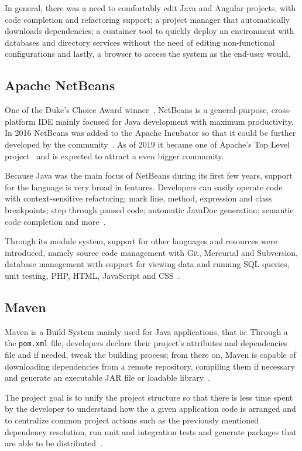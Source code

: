 In general, there was a need to comfortably edit Java and Angular projects, with code completion and refactoring support; a project manager that automatically downloads dependencies; a container tool to quickly deploy an environment with databases and directory services without the need of editing non-functional configurations and lastly, a browser to access the system as the end-user would.

\subsection{Apache NetBeans}\label{netbeans}
One of the Duke's Choice Award winner~\cite{dukechoice}, NetBeans is a general-purpose, cross-platform \gls{IDE} mainly focused for Java development with maximum productivity. In 2016 NetBeans was added to the Apache Incubator so that it could be further developed by the community~\cite{incubation}. As of 2019 it became one of Apache's Top Level project~\cite{graduation} and is expected to attract a even bigger community.

Because Java was the main focus of NetBeans during its first few years, support for the language is very broad in features. Developers can easily operate code with context-sensitive refactoring; mark line, method, expression and class breakpoints; step through paused code; automatic JavaDoc generation; semantic code completion and more~\cite{nbassistance}.

Through its module system, support for other languages and resources were introduced, namely source code management with Git, Mercurial and Subversion, database management with support for viewing data and running \gls{SQL} queries, unit testing, PHP, HTML, JavaScript and CSS~\cite{nettutorials}.

\subsection{Maven}
Maven is a Build System mainly used for Java applications, that is: Through a the \texttt{pom.xml} file, developers declare their project's attributes and dependencies file and if needed, tweak the building process; from there on, Maven is capable of downloading dependencies from a remote repository, compiling them if necessary and generate an executable \gls{JAR} file or loadable library~\cite{maven}.

The project goal is to unify the project structure so that there is less time spent by the developer to understand how the a given application code is arranged and to centralize common project actions such as the previously mentioned dependency resolution, run unit and integration tests and generate packages that are able to be distributed~\cite{mavenintro}.

